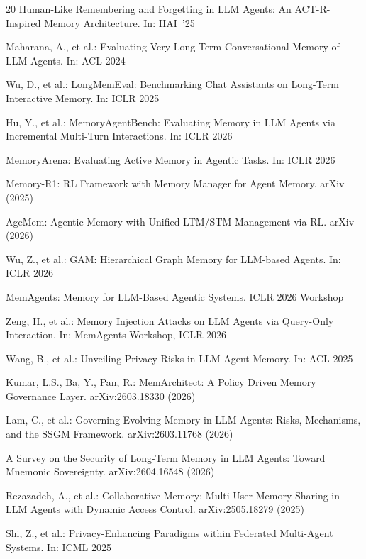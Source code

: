 \documentclass[runningheads]{llncs}
\begin{document}
\begin{thebibliography}{20}
Human-Like Remembering and Forgetting in LLM Agents: An ACT-R-Inspired
Memory Architecture. In: HAI~'25

Maharana, A., et al.: Evaluating Very Long-Term Conversational Memory of
LLM Agents. In: ACL 2024

Wu, D., et al.: LongMemEval: Benchmarking Chat Assistants on Long-Term
Interactive Memory. In: ICLR 2025

Hu, Y., et al.: MemoryAgentBench: Evaluating Memory in LLM Agents via
Incremental Multi-Turn Interactions. In: ICLR 2026

MemoryArena: Evaluating Active Memory in Agentic Tasks. In: ICLR 2026

Memory-R1: RL Framework with Memory Manager for Agent Memory.
arXiv (2025)

AgeMem: Agentic Memory with Unified LTM/STM Management via RL.
arXiv (2026)

Wu, Z., et al.: GAM: Hierarchical Graph Memory for LLM-based Agents.
In: ICLR 2026

MemAgents: Memory for LLM-Based Agentic Systems. ICLR 2026 Workshop

Zeng, H., et al.: Memory Injection Attacks on LLM Agents via
Query-Only Interaction. In: MemAgents Workshop, ICLR 2026

Wang, B., et al.: Unveiling Privacy Risks in LLM Agent Memory. In: ACL 2025

Kumar, L.S., Ba, Y., Pan, R.: MemArchitect: A Policy Driven Memory
Governance Layer. arXiv:2603.18330 (2026)

Lam, C., et al.: Governing Evolving Memory in LLM Agents: Risks,
Mechanisms, and the SSGM Framework. arXiv:2603.11768 (2026)

A Survey on the Security of Long-Term Memory in LLM Agents: Toward
Mnemonic Sovereignty. arXiv:2604.16548 (2026)

Rezazadeh, A., et al.: Collaborative Memory: Multi-User Memory Sharing
in LLM Agents with Dynamic Access Control. arXiv:2505.18279 (2025)

Shi, Z., et al.: Privacy-Enhancing Paradigms within Federated Multi-Agent
Systems. In: ICML 2025

\end{thebibliography}
\end{document}

